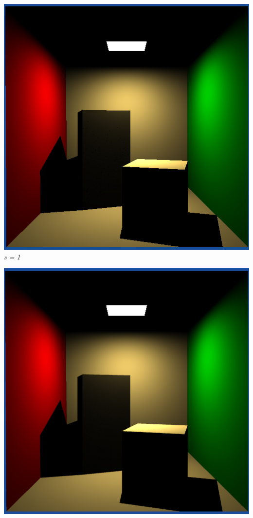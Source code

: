 \documentclass[a4,12pt]{article}
\begin{document}
	
	\begin{center}
		\begin{minipage}[b]{0.40\linewidth}
			\begin{center}
				\includegraphics[width = \textwidth]{./Worksheet6/cornellblocks1.png}\\
				\textit{s = 1}
			\end{center}
		\end{minipage}
		\hspace{0.05\linewidth}
		\begin{minipage}[b]{0.40\linewidth}
			\begin{center}
				\includegraphics[width = \textwidth]{./Worksheet6/cornellblocks2.png}\\

\end{center}
\end{minipage}
\end{center}
\end{document}
